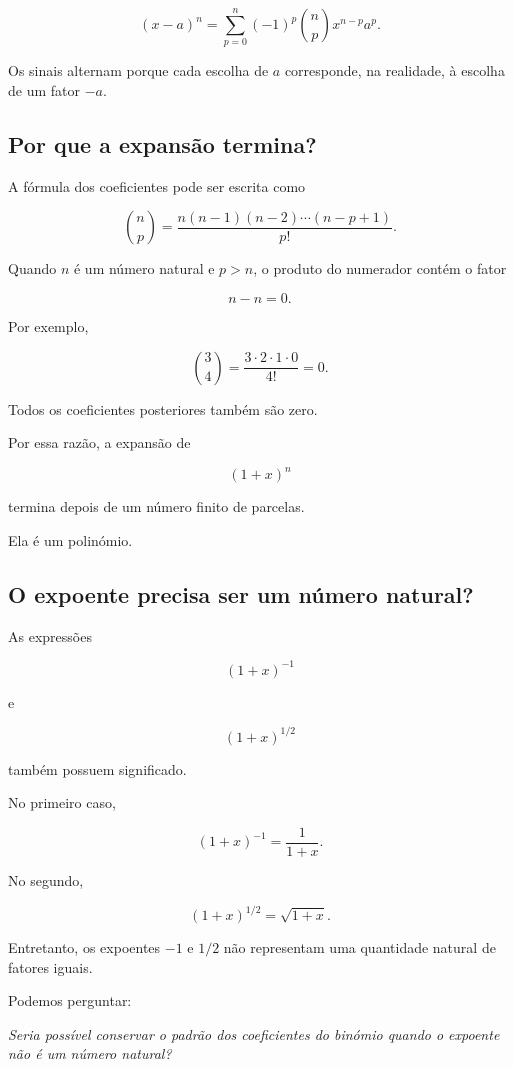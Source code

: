 \documentclass[12pt,a4paper]{article}
\begin{document}
\[
(x-a)^n
=
\sum_{p=0}^{n}
(-1)^p
\binom{n}{p}
x^{n-p}a^p.
\]

Os sinais alternam porque cada escolha de \(a\) corresponde, na
realidade, à escolha de um fator \(-a\).

\subsection{Por que a expansão termina?}

A fórmula dos coeficientes pode ser escrita como

\[
\binom{n}{p}
=
\frac{
n(n-1)(n-2)\cdots(n-p+1)
}{p!}.
\]

Quando \(n\) é um número natural e \(p>n\), o produto do numerador
contém o fator

\[
n-n=0.
\]

Por exemplo,

\[
\binom{3}{4}
=
\frac{3\cdot2\cdot1\cdot0}{4!}
=
0.
\]

Todos os coeficientes posteriores também são zero.

Por essa razão, a expansão de

\[
(1+x)^n
\]

termina depois de um número finito de parcelas.

Ela é um polinómio.

\subsection{O expoente precisa ser um número natural?}

As expressões

\[
(1+x)^{-1}
\]

e

\[
(1+x)^{1/2}
\]

também possuem significado.

No primeiro caso,

\[
(1+x)^{-1}=\frac{1}{1+x}.
\]

No segundo,

\[
(1+x)^{1/2}=\sqrt{1+x}.
\]

Entretanto, os expoentes \(-1\) e \(1/2\) não representam uma quantidade
natural de fatores iguais.

Podemos perguntar:

\begin{center}
\emph{Seria possível conservar o padrão dos coeficientes do binómio
quando o expoente não é um número natural?}
\end{center}
\end{document}
